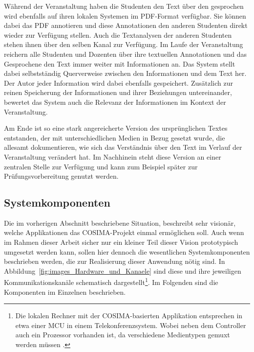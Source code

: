 \begin{kasten}
      Während der Veranstaltung haben die Studenten den Text über den gesprochen wird ebenfalls auf ihren lokalen Systemen im PDF-Format verfügbar. Sie können dabei das PDF annotieren und diese Annotationen den anderen Studenten direkt wieder zur Verfügung stellen. Auch die Textanalysen der anderen Studenten stehen ihnen über den selben Kanal zur Verfügung. Im Laufe der Veranstaltung reichern alle Studenten und Dozenten über ihre textuellen Annotationen und das Gesprochene den Text immer weiter mit Informationen an. Das System stellt dabei selbstständig Querverweise zwischen den Informationen und dem Text her. Der Autor jeder Information wird dabei ebenfalls gespeichert. Zusätzlich zur reinen Speicherung der Informationen und ihrer Beziehungen untereinander, bewertet das System auch die Relevanz der Informationen im Kontext der Veranstaltung.

      Am Ende ist so eine stark angereicherte Version des ursprünglichen Textes entstanden, der mit unterschiedlichen Medien in Bezug gesetzt wurde, die allesamt dokumentieren, wie sich das Verständnis über den Text im Verlauf der Veranstaltung verändert hat. Im Nachhinein steht diese Version an einer zentralen Stelle zur Verfügung und kann zum Beispiel später zur Prüfungsvorbereitung genutzt werden.


  \end{kasten}


\subsection{Systemkomponenten} %
\label{sub:systemkomponenten}

  Die im vorherigen Abschnitt beschriebene Situation, beschreibt sehr visionär, welche Applikationen das COSIMA-Projekt einmal ermöglichen soll. Auch wenn im Rahmen dieser Arbeit sicher nur ein kleiner Teil dieser Vision prototypisch umgesetzt werden kann, sollen hier dennoch die wesentlichen Systemkomponenten beschrieben werden, die zur Realisierung dieser Anwendung nötig sind. In Abbildung~\ref{fig:images_Hardware_und_Kanaele} sind diese und ihre jeweiligen Kommunikationskanäle schematisch dargestellt\footnote{Die lokalen Rechner mit der COSIMA-basierten Applikation entsprechen in etwa einer MCU in einem Telekonferenzsystem. Wobei neben dem Controller auch ein Prozessor vorhanden ist, da verschiedene Medientypen gemuxt werden müssen \citep[S. 224]{schwabe2001ckl}.}. Im Folgenden sind die Komponenten im Einzelnen beschrieben.

